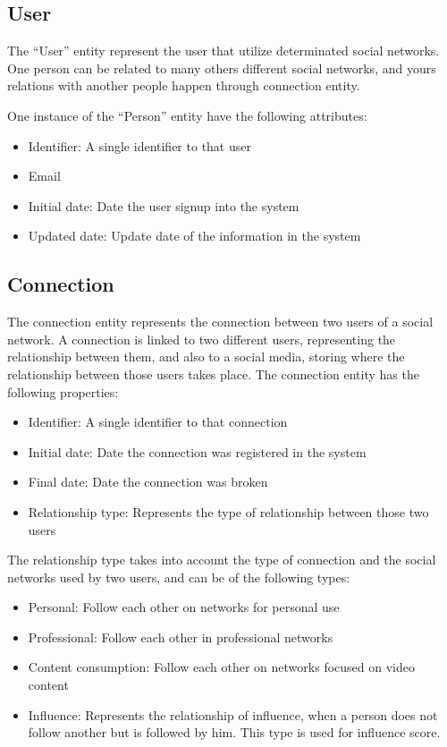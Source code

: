 \subsection{User}

The “User” entity represent the user that utilize determinated social networks. One person can be related to many others different social networks, and yours relations with another people happen through connection entity. 

One instance of the “Person” entity have the following attributes:


\begin{itemize}
\item Identifier: A single identifier to that user
\item Email
\item Initial date: Date the user signup into the system
\item Updated date: Update date of the information in the system
\end{itemize}

\subsection{Connection}
The connection entity represents the connection between two users of a social network. A connection is linked to two different users, representing the relationship between them, and also to a social media, storing where the relationship between those users takes place. The connection entity has the following properties:

\begin{itemize}
    \item Identifier: A single identifier to that connection
    \item Initial date: Date the connection was registered in the system
    \item Final date: Date the connection was broken
    \item Relationship type: Represents the type of relationship between those two users
\end{itemize}


The relationship type takes into account the type of connection and the social networks used by two users, and can be of the following types:

\begin{itemize}
    \item Personal: Follow each other on networks for personal use
    \item Professional: Follow each other in professional networks
    \item Content consumption: Follow each other on networks focused on video content
    \item Influence: Represents the relationship of influence, when a person does not follow another but is followed by him. This type is used for influence score.
\end{itemize}


